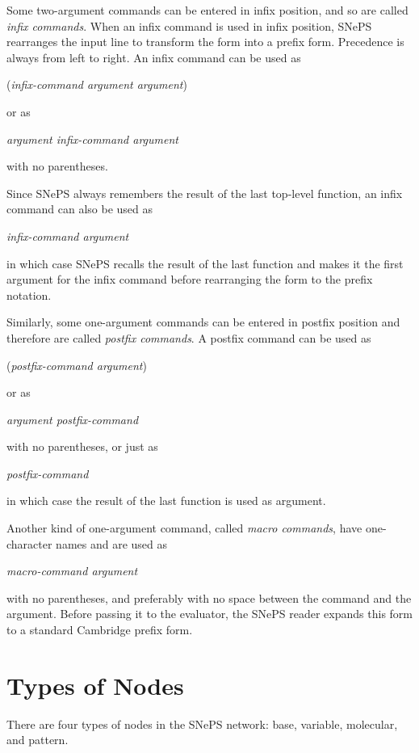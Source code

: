 \documentclass{book}
\begin{document}
Some two-argument commands can be entered in infix position, and so
are called {\em infix commands}.  When an infix
command is used in infix position, SNePS rearranges the input line to
transform the form into a prefix form.  Precedence is always from left
to right. An infix command can be used as
\begin{center}
({\em infix-command argument argument})
\end{center}
or as
\begin{center}
{\em argument infix-command argument}
\end{center}
with no parentheses.

Since SNePS always remembers the result of the last top-level function, an
infix command can also be used as
\begin{center}
{\em infix-command argument}
\end{center}
in which case SNePS recalls the result of the last function and makes it the
first argument for the infix command before rearranging the form to the prefix
notation.

Similarly, some one-argument commands can be entered in postfix position and
therefore are called {\em postfix commands}.
A postfix command can be used as
\begin{center}
({\em postfix-command argument}) 
\end{center}
or as
\begin{center} \em
argument postfix-command
\end{center}
with no parentheses, or just as
\begin{center} \em
postfix-command
\end{center}
in which case the result of the last function is used as argument.

Another kind of one-argument command, called {\em macro
commands}, have one-character names and are used
as
\begin{center}
{\em macro-command argument}
\end{center}
with no parentheses, and preferably with no space between the command
and the argument. Before passing it to the evaluator, the SNePS reader 
expands this form to a standard Cambridge prefix form.

\section{Types of Nodes}\label{sec:nodeTypes}
There are four types of nodes in the SNePS
network: base, variable, molecular, and pattern.
\end{document}
